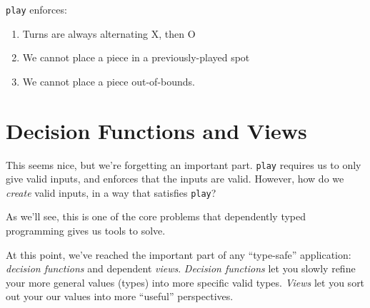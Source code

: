 \documentclass[]{article}
\newenvironment{Shaded}{}{}
\newcommand{\CommentTok}[1]{\textcolor[rgb]{0.38,0.63,0.69}{\textit{#1}}}
\newcommand{\DataTypeTok}[1]{\textcolor[rgb]{0.56,0.13,0.00}{#1}}
\newcommand{\FunctionTok}[1]{\textcolor[rgb]{0.02,0.16,0.49}{#1}}
\newcommand{\KeywordTok}[1]{\textcolor[rgb]{0.00,0.44,0.13}{\textbf{#1}}}
\newcommand{\NormalTok}[1]{#1}
\begin{document}
\begin{Shaded}
\end{Shaded}

\texttt{play} enforces:

\begin{enumerate}
\def\labelenumi{\arabic{enumi}.}
\tightlist
\item
  Turns are always alternating X, then O
\item
  We cannot place a piece in a previously-played spot
\item
  We cannot place a piece out-of-bounds.
\end{enumerate}

\hypertarget{decision-functions-and-views}{%
\section{Decision Functions and Views}\label{decision-functions-and-views}}

This seems nice, but we're forgetting an important part. \texttt{play} requires
us to only give valid inputs, and enforces that the inputs are valid. However,
how do we \emph{create} valid inputs, in a way that satisfies \texttt{play}?

As we'll see, this is one of the core problems that dependently typed
programming gives us tools to solve.

At this point, we've reached the important part of any ``type-safe''
application: \emph{decision functions} and dependent \emph{views}.
\emph{Decision functions} let you slowly refine your more general values (types)
into more specific valid types. \emph{Views} let you sort out your our values
into more ``useful'' perspectives.
\end{document}
